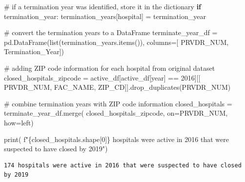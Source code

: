 \documentclass[
  letterpaper,
  DIV=11,
  numbers=noendperiod]{scrartcl}
\newenvironment{Shaded}{\begin{snugshade}}{\end{snugshade}}
\newcommand{\BuiltInTok}[1]{\textcolor[rgb]{0.00,0.23,0.31}{#1}}
\newcommand{\CommentTok}[1]{\textcolor[rgb]{0.37,0.37,0.37}{#1}}
\newcommand{\ControlFlowTok}[1]{\textcolor[rgb]{0.00,0.23,0.31}{\textbf{#1}}}
\newcommand{\DecValTok}[1]{\textcolor[rgb]{0.68,0.00,0.00}{#1}}
\newcommand{\NormalTok}[1]{\textcolor[rgb]{0.00,0.23,0.31}{#1}}
\newcommand{\OperatorTok}[1]{\textcolor[rgb]{0.37,0.37,0.37}{#1}}
\newcommand{\SpecialCharTok}[1]{\textcolor[rgb]{0.37,0.37,0.37}{#1}}
\newcommand{\SpecialStringTok}[1]{\textcolor[rgb]{0.13,0.47,0.30}{#1}}
\newcommand{\StringTok}[1]{\textcolor[rgb]{0.13,0.47,0.30}{#1}}
\begin{document}
\begin{Shaded}
\begin{Highlighting}[]
    \CommentTok{\# if a termination year was identified, store it in the dictionary}
    \ControlFlowTok{if}\NormalTok{ termination\_year:}
\NormalTok{        termination\_years[hospital] }\OperatorTok{=}\NormalTok{ termination\_year}

\CommentTok{\# convert the termination years to a DataFrame}
\NormalTok{terminate\_year\_df }\OperatorTok{=}\NormalTok{ pd.DataFrame(}\BuiltInTok{list}\NormalTok{(termination\_years.items()), columns}\OperatorTok{=}\NormalTok{[}
                                 \StringTok{\textquotesingle{}PRVDR\_NUM\textquotesingle{}}\NormalTok{, }\StringTok{\textquotesingle{}Termination\_Year\textquotesingle{}}\NormalTok{])}

\CommentTok{\# adding ZIP code information for each hospital from original dataset}
\NormalTok{closed\_hospitals\_zipcode }\OperatorTok{=}\NormalTok{ active\_df[active\_df[}\StringTok{\textquotesingle{}year\textquotesingle{}}\NormalTok{] }\OperatorTok{==} \DecValTok{2016}\NormalTok{][[}
    \StringTok{\textquotesingle{}PRVDR\_NUM\textquotesingle{}}\NormalTok{, }\StringTok{\textquotesingle{}FAC\_NAME\textquotesingle{}}\NormalTok{, }\StringTok{\textquotesingle{}ZIP\_CD\textquotesingle{}}\NormalTok{]].drop\_duplicates(}\StringTok{\textquotesingle{}PRVDR\_NUM\textquotesingle{}}\NormalTok{)}

\CommentTok{\# combine termination years with ZIP code information}
\NormalTok{closed\_hospitals }\OperatorTok{=}\NormalTok{ terminate\_year\_df.merge(}
\NormalTok{    closed\_hospitals\_zipcode, on}\OperatorTok{=}\StringTok{\textquotesingle{}PRVDR\_NUM\textquotesingle{}}\NormalTok{, how}\OperatorTok{=}\StringTok{\textquotesingle{}left\textquotesingle{}}\NormalTok{)}
\end{Highlighting}
\end{Shaded}

\begin{Shaded}
\begin{Highlighting}[]
\BuiltInTok{print}\NormalTok{(}
    \SpecialStringTok{f"}\SpecialCharTok{\{}\NormalTok{closed\_hospitals}\SpecialCharTok{.}\NormalTok{shape[}\DecValTok{0}\NormalTok{]}\SpecialCharTok{\}}\SpecialStringTok{ hospitals were active in 2016 that were suspected to have closed by 2019"}\NormalTok{)}
\end{Highlighting}
\end{Shaded}

\begin{verbatim}
174 hospitals were active in 2016 that were suspected to have closed by 2019
\end{verbatim}
\end{document}
